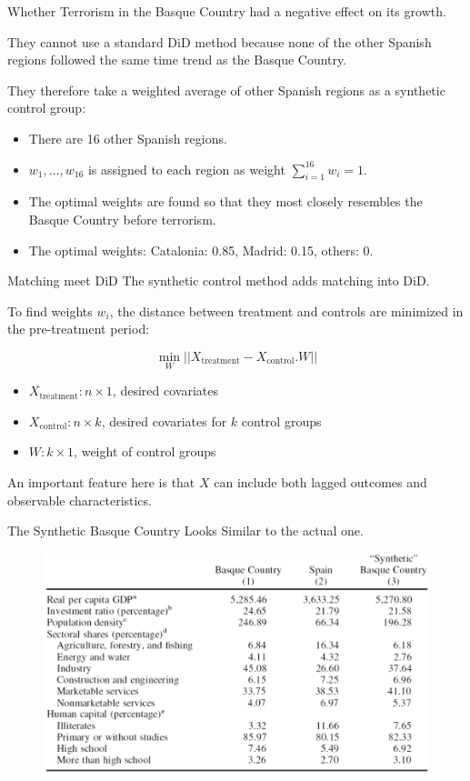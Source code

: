 \documentclass{beamer}
\begin{document}
\begin{frame}{\cite{abadie2003economic}}
Whether Terrorism in the Basque Country had a negative effect on its growth.\medskip

They cannot use a standard DiD method because none of the other Spanish regions followed the same time trend as the Basque Country.\medskip

They therefore take a weighted average of other Spanish regions as a
synthetic control group:
\begin{itemize}
\item There are 16 other Spanish regions.
\item $w_1,\dots,w_{16}$ is assigned to each region as weight $\sum_{i=1}^{16}w_i=1$.
\item The optimal weights are found so that they most closely resembles the Basque Country before terrorism.
\item The optimal weights: Catalonia: 0.85, Madrid: 0.15, others: 0.
\end{itemize}
\end{frame}

\begin{frame}{Matching meet DiD}
	The synthetic control method adds matching into DiD.\bigskip
	
	To find weights $w_i$, the distance between treatment and controls are minimized in the pre-treatment period:
	
	\[\min_W || X_{\text{treatment}}-X_{\text{control}}.W|| \]
	
	\begin{itemize}
		\item $X_{\text{treatment}}: n\times 1$, desired covariates 
		\item $X_{\text{control}}: n \times k$, desired covariates for $k$ control groups 
		\item $W: k \times 1$, weight of control groups
	\end{itemize}
	An important feature here is that $X$ can include both lagged outcomes and observable characteristics.
\end{frame}



\begin{frame}{\cite{abadie2003economic}}
The Synthetic Basque Country Looks Similar to the actual one.
\begin{figure}
\centering
\includegraphics[width=0.8\linewidth]{./Figures/Basque}
\end{figure}

\end{frame}
\end{document}

